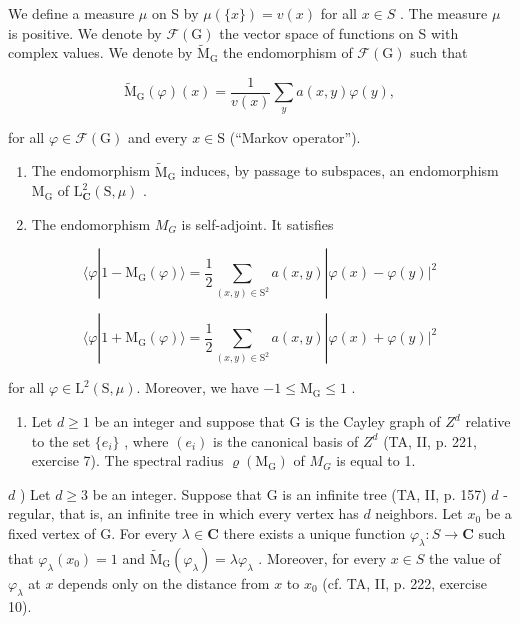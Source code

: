 We define a measure \(\mu\) on S by \(\mu(\{x\}) = v(x)\) for all \(x \in S\) . The measure \(\mu\) is positive. We denote by \(\mathcal{F}(\mathrm{G})\) the vector space of functions on S with complex values. We denote by \(\widetilde{\mathrm{M}}_{\mathrm{G}}\) the endomorphism of \(\mathcal{F}(\mathrm{G})\) such that

\[
\widetilde {\mathrm{M}} _ {\mathrm{G}} (\varphi) (x) = \frac {1}{v (x)} \sum_ {y} a (x, y) \varphi (y),
\]

for all \(\varphi\in\mathcal{F}(\mathrm{G})\) and every \(x\in\mathrm{S}\) (“Markov operator”).

\begin{enumerate}
\def\labelenumi{\alph{enumi})}
\item
  The endomorphism \(\widetilde{\mathrm{M}}_{\mathrm{G}}\) induces, by passage to subspaces, an endomorphism \(\mathrm{M_G}\) of \(\mathrm{L}_{\mathbf{C}}^{2}(\mathrm{S},\mu)\) .
\item
  The endomorphism \(M_{G}\) is self-adjoint. It satisfies
\end{enumerate}

\[
\langle \varphi | 1 - \mathrm{M} _ {\mathrm{G}} (\varphi) \rangle = \frac {1}{2} \sum_ {(x, y) \in \mathrm{S} ^ {2}} a (x, y) | \varphi (x) - \varphi (y) | ^ {2}
\]

\[
\langle \varphi | 1 + \mathrm{M} _ {\mathrm{G}} (\varphi) \rangle = \frac {1}{2} \sum_ {(x, y) \in \mathrm{S} ^ {2}} a (x, y) | \varphi (x) + \varphi (y) | ^ {2}
\]

for all \(\varphi\in\mathrm{L}^{2}(\mathrm{S},\mu)\). Moreover, we have \(-1\leqslant\mathrm{M}_{\mathrm{G}}\leqslant1\) .

\begin{enumerate}
\def\labelenumi{\alph{enumi})}
\setcounter{enumi}{2}
\tightlist
\item
  Let \(d \geqslant 1\) be an integer and suppose that G is the Cayley graph of \(Z^{d}\) relative to the set \(\{e_{i}\}\) , where \((e_{i})\) is the canonical basis of \(Z^{d}\) (TA, II, p. 221, exercise 7). The spectral radius \(\varrho(\mathrm{M}_{\mathrm{G}})\) of \(M_{G}\) is equal to 1.
\end{enumerate}

\(d\) ) Let \(d \geqslant 3\) be an integer. Suppose that G is an infinite tree (TA, II, p. 157) \(d\) -regular, that is, an infinite tree in which every vertex has \(d\) neighbors. Let \(x_0\) be a fixed vertex of G. For every \(\lambda \in \mathbf{C}\) there exists a unique function \(\varphi_{\lambda} \colon S \to \mathbf{C}\) such that \(\varphi_{\lambda}(x_0) = 1\) and \(\widetilde{\mathrm{M}}_{\mathrm{G}}(\varphi_{\lambda}) = \lambda \varphi_{\lambda}\) . Moreover, for every \(x \in S\) the value of \(\varphi_{\lambda}\) at \(x\) depends only on the distance from \(x\) to \(x_0\) (cf. TA, II, p. 222, exercise 10).

